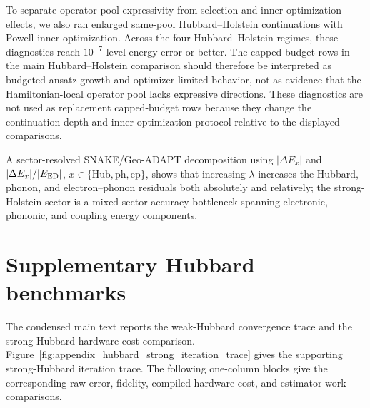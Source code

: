 \documentclass[
  reprint,
  amsmath,
  amssymb,
  aps,
  pra,
  nofootinbib,
  superscriptaddress,
  floatfix
]{revtex4-2}
\begin{document}
To separate operator-pool expressivity from selection and inner-optimization effects, we also ran enlarged same-pool Hubbard--Holstein continuations with Powell inner optimization. Across the four Hubbard--Holstein regimes, these diagnostics reach \(10^{-7}\)-level energy error or better. The capped-budget rows in the main Hubbard--Holstein comparison should therefore be interpreted as budgeted ansatz-growth and optimizer-limited behavior, not as evidence that the Hamiltonian-local operator pool lacks expressive directions. These diagnostics are not used as replacement capped-budget rows because they change the continuation depth and inner-optimization protocol relative to the displayed comparisons.


A sector-resolved SNAKE/Geo-ADAPT decomposition using \(|\Delta E_x|\) and \(|\Delta E_x|/|E_{\rm ED}|\), \(x\in\{\mathrm{Hub},\mathrm{ph},\mathrm{ep}\}\), shows that increasing \(\lambda\) increases the Hubbard, phonon, and electron--phonon residuals both absolutely and relatively; the strong-Holstein sector is a mixed-sector accuracy bottleneck spanning electronic, phononic, and coupling energy components.

\section{Supplementary Hubbard benchmarks}
\label{app:supplementary_transfer_benchmarks}


The condensed main text reports the weak-Hubbard convergence trace and the strong-Hubbard hardware-cost comparison. Figure~\ref{fig:appendix_hubbard_strong_iteration_trace} gives the supporting strong-Hubbard iteration trace. The following one-column blocks give the corresponding raw-error, fidelity, compiled hardware-cost, and estimator-work comparisons.
\end{document}
